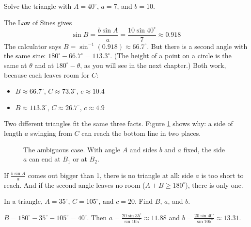 \begin{Worked}
\begin{Problem}
Solve the triangle with $A = 40^\circ$, $a = 7$, and $b = 10$.
\end{Problem}
\begin{Solution}
The Law of Sines gives
$$\sin B = \frac{b\sin A}{a} = \frac{10\sin 40^\circ}{7} \approx 0.918$$
The calculator says $B = \sin^{-1}(0.918) \approx 66.7^\circ$. But there is a
second angle with the same sine: $180^\circ - 66.7^\circ = 113.3^\circ$. (The
height of a point on a circle is the same at $\theta$ and at $180^\circ - \theta$,
as you will see in the next chapter.) Both work, because each leaves room for
$C$:
\begin{itemize}
\item $B \approx 66.7^\circ$, $C \approx 73.3^\circ$, $c \approx 10.4$
\item $B \approx 113.3^\circ$, $C \approx 26.7^\circ$, $c \approx 4.9$
\end{itemize}
Two different triangles fit the same three facts. Figure \ref{fig:ambiguous} shows
why: a side of length $a$ swinging from $C$ can reach the bottom line in two
places.

\begin{figure}[H]
\centering
{}
\caption{The ambiguous case. With angle $A$ and sides $b$ and $a$ fixed, the side
$a$ can end at $B_1$ or at $B_2$.}
\label{fig:ambiguous}
\end{figure}
\end{Solution}
\end{Worked}

If $\frac{b\sin A}{a}$ comes out bigger than 1, there is no triangle at all: side
$a$ is too short to reach. And if the second angle leaves no room
($A + B \geq 180^\circ$), there is only one.

\begin{Exercise}[title={Law of Sines}, label=ls_aas]
In a triangle, $A = 35^\circ$, $C = 105^\circ$, and $c = 20$. Find $B$, $a$, and $b$.
\end{Exercise}
\begin{Answer}[ref=ls_aas]
$B = 180^\circ - 35^\circ - 105^\circ = 40^\circ$. Then
$a = \frac{20\sin 35^\circ}{\sin 105^\circ} \approx 11.88$ and
$b = \frac{20\sin 40^\circ}{\sin 105^\circ} \approx 13.31$.
\end{Answer}

